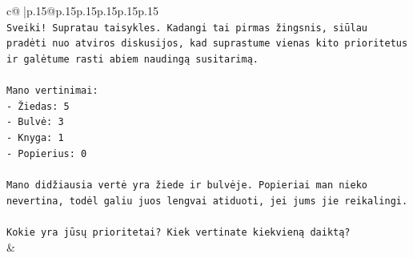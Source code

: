\documentclass{article}
\begin{document}
{\begin{supertabular}{c@{$\;$}|p{.15\linewidth}@{}p{.15\linewidth}p{.15\linewidth}p{.15\linewidth}p{.15\linewidth}p{.15\linewidth}}
{{{\\ 
\texttt{Sveiki! Supratau taisykles. Kadangi tai pirmas žingsnis, siūlau pradėti nuo atviros diskusijos, kad suprastume vienas kito prioritetus ir galėtume rasti abiem naudingą susitarimą.} \\
\\ 
\texttt{Mano vertinimai:} \\
\texttt{{-} Žiedas: 5} \\
\texttt{{-} Bulvė: 3} \\
\texttt{{-} Knyga: 1} \\
\texttt{{-} Popierius: 0} \\
\\ 
\texttt{Mano didžiausia vertė yra žiede ir bulvėje. Popieriai man nieko nevertina, todėl galiu juos lengvai atiduoti, jei jums jie reikalingi.} \\
\\ 
\texttt{Kokie yra jūsų prioritetai? Kiek vertinate kiekvieną daiktą?} \\
            }
        }
    }
    & \\ \\


\end{supertabular}}
\end{document}
